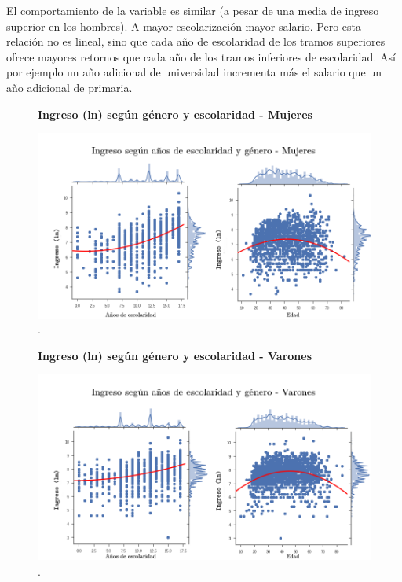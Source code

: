 El comportamiento de la variable es similar (a pesar de una media de ingreso superior en los hombres). A mayor escolarización mayor salario. Pero esta relación no es lineal, sino que cada año de escolaridad de los tramos superiores ofrece mayores retornos que cada año de los tramos inferiores de escolaridad. Así por ejemplo un año adicional de universidad incrementa más el salario que un año adicional de primaria.

 \begin{figure}[!htb]
 	\textbf{Ingreso (ln) según género y escolaridad - Mujeres}\par\medskip
 	\includegraphics[scale = 0.4]{../img/capitulo3/ingresoVedadVescolaridadMujeres.png}
 	\caption{.}
 \end{figure}

 \begin{figure}[!htb]
 	\textbf{Ingreso (ln) según género y escolaridad - Varones}\par\medskip
 	\includegraphics[scale = 0.4]{../img/capitulo3/ingresoVedadVescolaridadVarones.png}
 	\caption{.}
 \end{figure}
 
